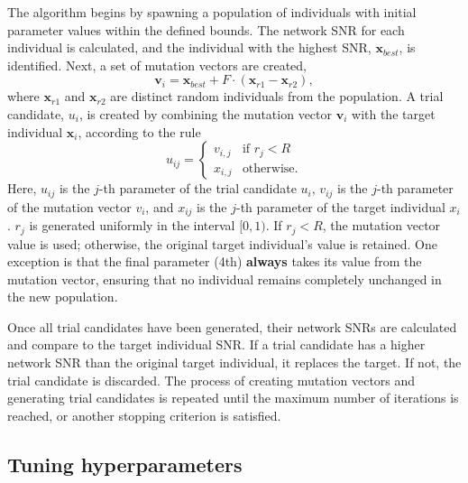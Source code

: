 The algorithm begins by spawning a population of individuals with initial parameter values within the defined bounds. The network SNR for each individual is calculated, and the individual with the highest SNR, \( \mathbf{x}_{best} \), is identified. Next, a set of mutation vectors are created,
%
\begin{equation}
    \mathbf{v}_i = \mathbf{x}_{best} + F \cdot (\mathbf{x}_{r1} - \mathbf{x}_{r2}),
\end{equation}
%
where \( \mathbf{x}_{r1} \) and \( \mathbf{x}_{r2} \) are distinct random individuals from the population. A trial candidate, \( u_i \), is created by combining the mutation vector \( \mathbf{v}_i \) with the target individual \( \mathbf{x}_i \), according to the rule
%
\begin{equation}
    u_{ij} = 
    \begin{cases} 
    v_{i,j} & \text{if } r_j < R \\ 
    x_{i,j} & \text{otherwise}.
    \end{cases}
\end{equation}
%
Here, \( u_{ij} \) is the \( j \)-th parameter of the trial candidate \( u_i \), \( v_{ij} \) is the \( j \)-th parameter of the mutation vector \( v_i \), and \( x_{ij} \) is the \( j \)-th parameter of the target individual \( x_i \). \( r_j \) is generated uniformly in the interval \([0, 1)\). If \( r_j < R \), the mutation vector value is used; otherwise, the original target individual's value is retained. One exception is that the final parameter (4th) \textbf{always} takes its value from the mutation vector, ensuring that no individual remains completely unchanged in the new population.

Once all trial candidates have been generated, their network SNRs are calculated and compare to the target individual SNR. If a trial candidate has a higher network SNR than the original target individual, it replaces the target. If not, the trial candidate is discarded. The process of creating mutation vectors and generating trial candidates is repeated until the maximum number of iterations is reached, or another stopping criterion is satisfied.

\subsection{\label{7:sec:de_hyperparameter_tuning}Tuning hyperparameters}

